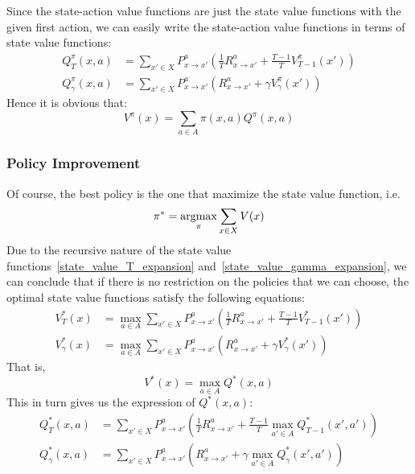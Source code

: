 Since the state-action value functions are just the state value functions with the given first action, we can 
easily write the state-action value functions in terms of state value functions:
\begin{align}
    Q^\pi_T(x, a) &= \sum_{x' \in X} P_{x \rightarrow x'}^a\left(\frac{1}{T}R_{x \rightarrow x'}^a +
    \frac{T-1}{T}V^\pi_{T-1}(x')\right)\label{state-action_value_T_expansion}\\
    Q^\pi_\gamma(x, a) &= \sum_{x' \in X} P_{x \rightarrow x'}^a\left(R_{x \rightarrow x'}^a + \gamma 
    V^\pi_\gamma(x')\right)\label{state-action_value_gamma_expansion}
\end{align}
Hence it is obvious that:
\begin{equation}\label{relation_V_Q}
V^\pi(x) = \sum_{a \in A}\pi(x, a)Q^\pi(x, a)
\end{equation}


\subsubsection{Policy Improvement}
Of course, the best policy is the one that maximize the state value function, i.e.
$$\pi^* = \operatorname*{argmax}_\pi \sum_{x \in X}V(x)$$
Due to the recursive nature of the state value functions~\eqref{state_value_T_expansion}
and~\eqref{state_value_gamma_expansion}, we can conclude that if there is no restriction on the policies that 
we can choose, the optimal state value functions satisfy the following equations:
\begin{align}
    V^*_T(x) &= \max_{a \in A} \sum_{x' \in X}P_{x \rightarrow x'}^a\left(\frac{1}{T}R_{x \rightarrow x'}^a +
    \frac{T-1}{T}V^*_{T-1}(x')\right)\\
    V^*_\gamma(x) &= \max_{a \in A} \sum_{x' \in X}P_{x \rightarrow x'}^a\left(R_{x \rightarrow x'}^a + \gamma
    V^*_\gamma(x')\right)
\end{align}
That is,
\begin{equation}\label{relation_optimal_V_Q}
    V^*(x) = \max_{a \in A}Q^*(x, a)
\end{equation}
This in turn gives us the expression of $Q^*(x, a)$:
\begin{align}
    Q^*_T(x, a) &= \sum_{x' \in X} P_{x \rightarrow x'}^a\left(\frac{1}{T}R_{x \rightarrow x'}^a +
    \frac{T-1}{T}\max_{a' \in A}Q^*_{T-1}(x',a')\right)\\
    Q^*_\gamma(x, a) &= \sum_{x' \in X} P_{x \rightarrow x'}^a\left(R_{x \rightarrow x'}^a + \gamma 
    \max_{a' \in A}Q^*_\gamma(x', a')\right)
\end{align}

